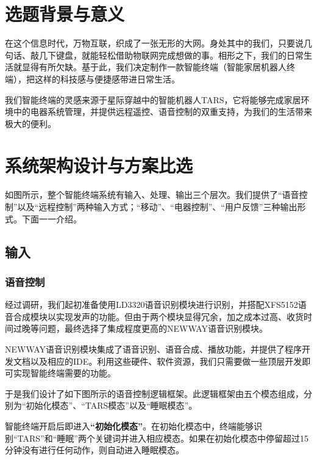 \section{选题背景与意义}
    \hspace{1.5em}在这个信息时代，万物互联，织成了一张无形的大网。身处其中的我们，只要说几句话、敲几下键盘，就能轻松借助物联网完成想做的事。相形之下，我们的日常生活就显得有所欠缺。基于此，我们决定制作一款智能终端（智能家居机器人终端），把这样的科技感与便捷感带进日常生活。

    \hspace{1.5em}我们智能终端的灵感来源于星际穿越中的智能机器人TARS，它将能够完成家居环境中的电器系统管理，并提供远程遥控、语音控制的双重支持，为我们的生活带来极大的便利。

\section{系统架构设计与方案比选}
    \hspace{1.5em}如图所示，整个智能终端系统有输入、处理、输出三个层次。我们提供了“语音控制”以及“远程控制”两种输入方式；“移动”、“电器控制”、“用户反馈”三种输出形式。下面一一介绍。
    \subsection{输入}
    \subsubsection{语音控制}
    \hspace{1.5em}经过调研，我们起初准备使用LD3320语音识别模块进行识别，并搭配XFS5152语音合成模块以实现发声的功能。但由于两个模块显得冗余，加之成本过高、收货时间过晚等问题，最终选择了集成程度更高的NEWWAY语音识别模块。

    \hspace{1.5em}NEWWAY语音识别模块集成了语音识别、语音合成、播放功能，并提供了程序开发文档以及相应的IDE。利用这些硬件、软件资源，我们只需要做一些顶层开发即可实现智能终端需要的功能。

    \hspace{1.5em}于是我们设计了如下图所示的语音控制逻辑框架。此逻辑框架由五个模态组成，分别为“初始化模态”、“TARS模态”以及“睡眠模态”。
    \newline 

    \hspace{1.5em}智能终端开启后即进入\textbf{“初始化模态”}。在初始化模态中，终端能够识别“TARS”和“睡眠”两个关键词并进入相应模态。如果在初始化模态中停留超过15分钟没有进行任何动作，则自动进入睡眠模态。
    \newline
    
